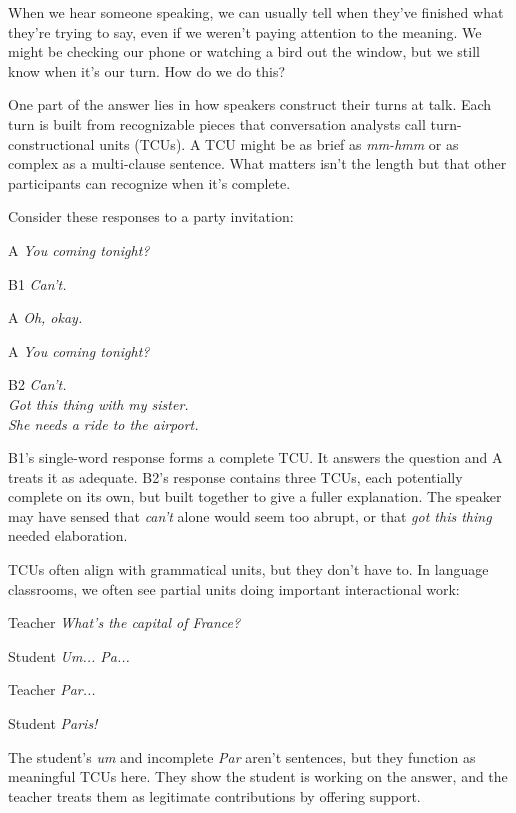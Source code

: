 When we hear someone speaking, we can usually tell when they've finished what they're trying to say, even if we weren't paying attention to the meaning. We might be checking our phone or watching a bird out the window, but we still know when it's our turn. How do we do this?

One part of the answer lies in how speakers construct their turns at talk. Each turn is built from recognizable pieces that conversation analysts call turn-constructional units (TCUs). A TCU might be as brief as \textit{mm-hmm} or as complex as a multi-clause sentence. What matters isn't the length but that other participants can recognize when it's complete.

Consider these responses to a party invitation:

\ea
\begin{dialogue}
\item[A] \textit{You coming tonight?}
\item[B1] \textit{Can't.}
\item[A] \textit{Oh, okay.}
\end{dialogue}
\z

\ea
\begin{dialogue}
\item[A] \textit{You coming tonight?}
\item[B2] \textit{Can't.} \\
   \textit{Got this thing with my sister.} \\
   \textit{She needs a ride to the airport.}
\end{dialogue}
\z
B1's single-word response forms a complete TCU. It answers the question and A treats it as adequate. B2's response contains three TCUs, each potentially complete on its own, but built together to give a fuller explanation. The speaker may have sensed that \textit{can't} alone would seem too abrupt, or that \textit{got this thing} needed elaboration.

TCUs often align with grammatical units, but they don't have to. In language classrooms, we often see partial units doing important interactional work:

\ea
\begin{dialogue}
\item[Teacher] \textit{What's the capital of France?}
\item[Student] \textit{Um... Pa...}
\item[Teacher] \textit{Par...}
\item[Student] \textit{Paris!}
\end{dialogue}
\z
The student's \textit{um} and incomplete \textit{Par} aren't sentences, but they function as meaningful TCUs here. They show the student is working on the answer, and the teacher treats them as legitimate contributions by offering support.

